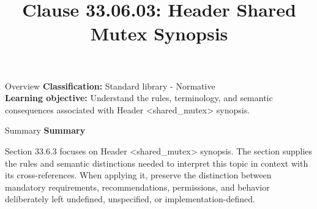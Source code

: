 \documentclass[10pt,letterpaper]{article}
\title{Clause 33.06.03: Header Shared Mutex Synopsis}
\author{}
\date{}
\begin{document}
\maketitle
\begin{CornellOverviewBox}{Overview}
\textbf{Classification:} Standard library - Normative\\[2pt]
\textbf{Learning objective:} Understand the rules, terminology, and semantic consequences associated with Header <shared\_mutex> synopsis.
\end{CornellOverviewBox}\begin{CornellSummaryBox}{Summary}
{\sffamily\bfseries\color{Accent} Summary}\par\vspace{3pt}Section 33.6.3 focuses on Header <shared\_mutex> synopsis. The section supplies the rules and semantic distinctions needed to interpret this topic in context with its cross-references. When applying it, preserve the distinction between mandatory requirements, recommendations, permissions, and behavior deliberately left undefined, unspecified, or implementation-defined.
\end{CornellSummaryBox}
\end{document}
